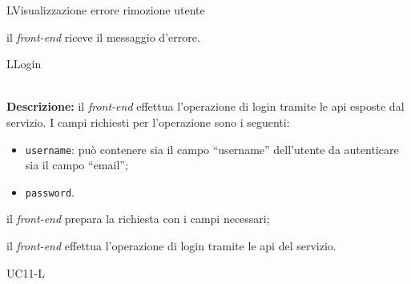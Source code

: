 \begin{usecase}{9}{L}{Visualizzazione errore rimozione utente}



	\begin{ucscenarioprincipale}
		\item il \textit{front-end} riceve il messaggio d'errore.
	\end{ucscenarioprincipale}


	\label{uc:vis-errore-rimozione-utente-l}
\end{usecase}

\begin{usecase}{10}{L}{Login}


	\textbf{\\Descrizione:} il \textit{front-end} effettua l'operazione di login tramite le \acrshort{api} esposte dal servizio.
	I campi richiesti per l'operazione sono i seguenti:
	\begin{itemize}[noitemsep]
		\item \texttt{username}: può contenere sia il campo ``username'' dell'utente da autenticare sia il campo ``email'';
		\item \texttt{password}.
	\end{itemize}

	\begin{ucscenarioprincipale}
		\item il \textit{front-end} prepara la richiesta con i campi necessari;
		\item il \textit{front-end} effettua l'operazione di login tramite le \acrshort{api} del servizio.
	\end{ucscenarioprincipale}
	

	\begin{ucestensioni}
		\item UC11-L
	\end{ucestensioni}

	\label{uc:login-l}
\end{usecase}

